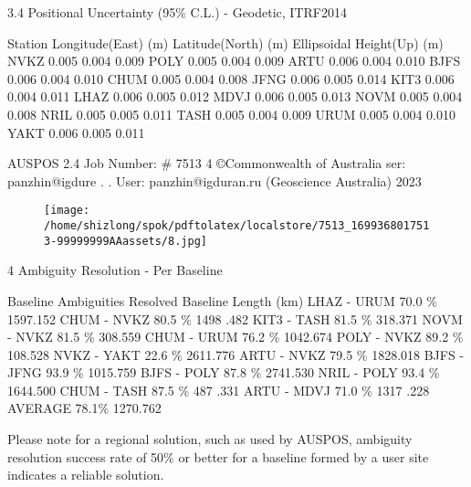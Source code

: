 \documentclass[a4paper,12pt]{article}
\begin{document}
\vspace{10pt}

    3.4 Positional Uncertainty (95\% C.L.) - Geodetic, ITRF2014 

\vspace{10pt}

         Station Longitude(East) (m) Latitude(North) (m)  Ellipsoidal Height(Up) (m)                   NVKZ 0.005 0.004 0.009  POLY 0.005 0.004 0.009  ARTU 0.006 0.004 0.010  BJFS 0.006 0.004 0.010  CHUM 0.005 0.004 0.008  JFNG 0.006 0.005 0.014  KIT3 0.006 0.004 0.011  LHAZ 0.006 0.005 0.012  MDVJ 0.006 0.005 0.013  NOVM 0.005 0.004 0.008  NRIL 0.005 0.005 0.011  TASH 0.005 0.004 0.009  URUM 0.005 0.004 0.010  YAKT 0.006 0.005 0.011     

\vspace{10pt}

         AUSPOS 2.4 Job Number: \# 7513 4 ©Commonwealth of Australia    ser: panzhin@igdure . .  User: panzhin@igduran.ru (Geoscience Australia) 2023 

\vspace{10pt}

\par

\vspace{10pt}

\begin{figure}[h]

\texttt{[image: /home/shizlong/spok/pdftolatex/localstore/7513\_1699368017513-99999999AAassets/8.jpg]}

\centering

\end{figure}

    4 Ambiguity Resolution - Per Baseline 

\vspace{10pt}

                        Baseline Ambiguities Resolved Baseline Length (km)  LHAZ - URUM 70.0 \% 1597.152  CHUM - NVKZ 80.5 \% 1498 .482  KIT3 - TASH 81.5 \% 318.371  NOVM - NVKZ 81.5 \% 308.559  CHUM - URUM 76.2 \% 1042.674  POLY - NVKZ 89.2 \% 108.528  NVKZ - YAKT 22.6 \% 2611.776  ARTU - NVKZ 79.5 \% 1828.018  BJFS - JFNG 93.9 \% 1015.759  BJFS - POLY 87.8 \% 2741.530  NRIL - POLY 93.4 \% 1644.500  CHUM - TASH 87.5 \% 487 .331  ARTU - MDVJ 71.0 \% 1317 .228  AVERAGE 78.1\% 1270.762     

\vspace{10pt}

    Please note for a regional solution, such as used by AUSPOS, ambiguity resolution success  rate of 50\% or better for a baseline formed by a user site indicates a reliable solution. 
\end{document}
